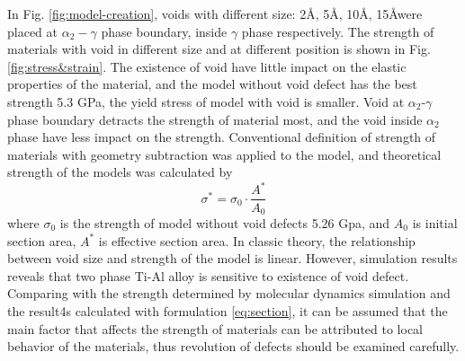 \documentclass[metals,article,submit,moreauthors,pdftex,10pt,a4paper]{Definitions/mdpi}
\begin{document}
In Fig. \ref{fig:model-creation}, voids with different size: 2\AA, 5\AA, 10\AA, 15\AA were placed  at $\alpha_2-\gamma$ phase boundary, inside $\gamma$ phase respectively. The strength of materials with void in different size and at different position is shown in Fig.\ref{fig:stress&strain}. The existence of void have little impact on the elastic properties of the material, and the model without void defect has the best strength 5.3 GPa, the yield stress of model with void is smaller. Void at $\alpha_2$-$\gamma$ phase boundary  detracts the strength of  material most, and the void inside $\alpha_2$ phase  have less impact on the strength.          
Conventional definition of strength of materials with geometry subtraction was applied to the model, and theoretical strength of the models was calculated by
\begin{equation} \label{eq:section} 
\sigma^* = \sigma_0 \cdot \frac{A^*}{A_0}
\end{equation}
where $\sigma_0$ is the strength of model without void defects 5.26 Gpa, and $A_0$ is initial section area,  $A^*$ is effective section area.  In classic theory, the relationship between void size and strength of the model is linear. However, simulation results reveals that two phase Ti-Al alloy is sensitive to existence of void defect.  Comparing with the strength determined by molecular dynamics simulation and the result4s calculated with formulation \ref{eq:section}, it can be assumed that the main factor that affects the strength of materials can be attributed to local behavior of the materials, thus revolution of defects should be examined carefully.
\end{document}
